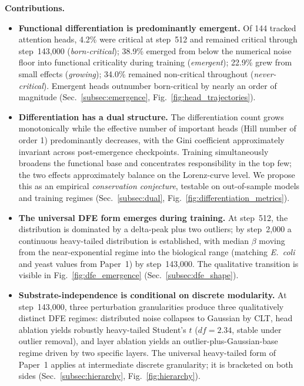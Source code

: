 \documentclass{article}
\begin{document}
\textbf{Contributions.}
\begin{itemize}
    \item \textbf{Functional differentiation is predominantly emergent.} Of 144 tracked attention heads, 4.2\% were critical at step~512 and remained critical through step~143,000 (\emph{born-critical}); 38.9\% emerged from below the numerical noise floor into functional criticality during training (\emph{emergent}); 22.9\% grew from small effects (\emph{growing}); 34.0\% remained non-critical throughout (\emph{never-critical}). Emergent heads outnumber born-critical by nearly an order of magnitude (Sec.~\ref{subsec:emergence}, Fig.~\ref{fig:head_trajectories}).
    \item \textbf{Differentiation has a dual structure.} The differentiation count grows monotonically while the effective number of important heads (Hill number of order 1) predominantly decreases, with the Gini coefficient approximately invariant across post-emergence checkpoints. Training simultaneously broadens the functional base and concentrates responsibility in the top few; the two effects approximately balance on the Lorenz-curve level. We propose this as an empirical \emph{conservation conjecture}, testable on out-of-sample models and training regimes (Sec.~\ref{subsec:dual}, Fig.~\ref{fig:differentiation_metrics}).
    \item \textbf{The universal DFE form emerges during training.} At step~512, the distribution is dominated by a delta-peak plus two outliers; by step~2,000 a continuous heavy-tailed distribution is established, with median $\beta$ moving from the near-exponential regime into the biological range (matching \emph{E.~coli} and yeast values from Paper~1) by step~143,000. The qualitative transition is visible in Fig.~\ref{fig:dfe_emergence} (Sec.~\ref{subsec:dfe_shape}).
    \item \textbf{Substrate-independence is conditional on discrete modularity.} At step~143,000, three perturbation granularities produce three qualitatively distinct DFE regimes: distributed noise collapses to Gaussian by CLT, head ablation yields robustly heavy-tailed Student's $t$ ($df = 2.34$, stable under outlier removal), and layer ablation yields an outlier-plus-Gaussian-base regime driven by two specific layers. The universal heavy-tailed form of Paper~1 applies at intermediate discrete granularity; it is bracketed on both sides (Sec.~\ref{subsec:hierarchy}, Fig.~\ref{fig:hierarchy}).
\end{itemize}
\end{document}
